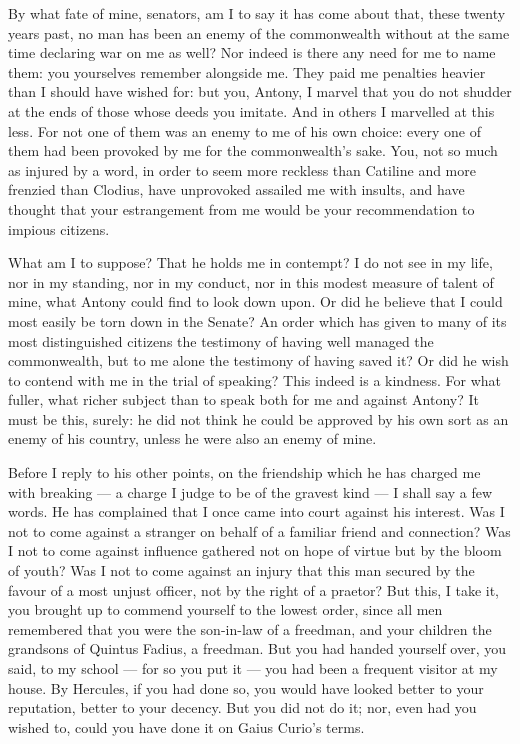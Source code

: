 
 By what fate of mine, senators, am I to say it has come about that, these twenty years past, no man has been an enemy of the commonwealth without at the same time declaring war on me as well? Nor indeed is there any need for me to name them: you yourselves remember alongside me. They paid me penalties heavier than I should have wished for: but you, Antony, I marvel that you do not shudder at the ends of those whose deeds you imitate. And in others I marvelled at this less. For not one of them was an enemy to me of his own choice: every one of them had been provoked by me for the commonwealth's sake. You, not so much as injured by a word, in order to seem more reckless than Catiline and more frenzied than Clodius, have unprovoked assailed me with insults, and have thought that your estrangement from me would be your recommendation to impious citizens.

 What am I to suppose? That he holds me in contempt? I do not see in my life, nor in my standing, nor in my conduct, nor in this modest measure of talent of mine, what Antony could find to look down upon. Or did he believe that I could most easily be torn down in the Senate? An order which has given to many of its most distinguished citizens the testimony of having well managed the commonwealth, but to me alone the testimony of having saved it? Or did he wish to contend with me in the trial of speaking? This indeed is a kindness. For what fuller, what richer subject than to speak both for me and against Antony? It must be this, surely: he did not think he could be approved by his own sort as an enemy of his country, unless he were also an enemy of mine.

 Before I reply to his other points, on the friendship which he has charged me with breaking --- a charge I judge to be of the gravest kind --- I shall say a few words. He has complained that I once came into court against his interest. Was I not to come against a stranger on behalf of a familiar friend and connection? Was I not to come against influence gathered not on hope of virtue but by the bloom of youth? Was I not to come against an injury that this man secured by the favour of a most unjust officer, not by the right of a praetor? But this, I take it, you brought up to commend yourself to the lowest order, since all men remembered that you were the son-in-law of a freedman, and your children the grandsons of Quintus Fadius, a freedman. But you had handed yourself over, you said, to my school --- for so you put it --- you had been a frequent visitor at my house. By Hercules, if you had done so, you would have looked better to your reputation, better to your decency. But you did not do it; nor, even had you wished to, could you have done it on Gaius Curio's terms.

